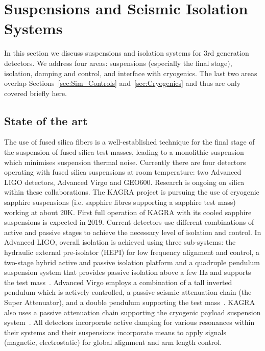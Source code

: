 \chapter{Suspensions and Seismic Isolation Systems}
\label{sec:Suspensions_Isolation}

\vspace{-1cm}
\begin{samepage} %

In this section we discuss suspensions and isolation systems for 3rd generation detectors. We address four areas: suspensions (especially the final stage), isolation, damping and control, and interface with cryogenics. The last two areas overlap Sections~\ref{sec:Sim_Controls} and~\ref{sec:Cryogenics} and thus are only covered briefly here.

\section{State of the art}
The use of fused silica fibers is a well-established technique for the final stage of the suspension of fused silica test masses, leading to a monolithic suspension which minimises suspension thermal noise. Currently there are four detectors operating with fused silica suspensions at room temperature: two Advanced LIGO detectors, Advanced Virgo and GEO600. Research is ongoing on silica within these collaborations.
The KAGRA project is pursuing the use of cryogenic sapphire suspensions (i.e. sapphire fibres supporting a sapphire test mass) working at about 20K. First full operation of KAGRA with its cooled sapphire suspensions is expected in 2019.
Current detectors use different combinations of active and passive stages to achieve the necessary level of isolation and control. In Advanced LIGO, overall isolation is achieved using three sub-systems: the hydraulic external pre-isolator (HEPI) for low frequency alignment and control, a two-stage hybrid active and passive isolation platform and a quadruple pendulum suspension system that provides passive isolation above a few Hz and supports the test mass~\cite{Matichard_2015}. Advanced Virgo employs a combination of a tall inverted pendulum which is actively controlled, a passive seismic attenuation chain (the Super Attenuator), and a double pendulum supporting the test mass~\cite{AdvancedVirgo2015}. KAGRA also uses a passive attenuation chain supporting the cryogenic payload suspension system~\cite{KAGRA2013}. All detectors incorporate active damping for various resonances within their systems and their suspensions incorporate means to apply signals (magnetic, electrostatic) for global alignment and arm length control.


\end{samepage}
